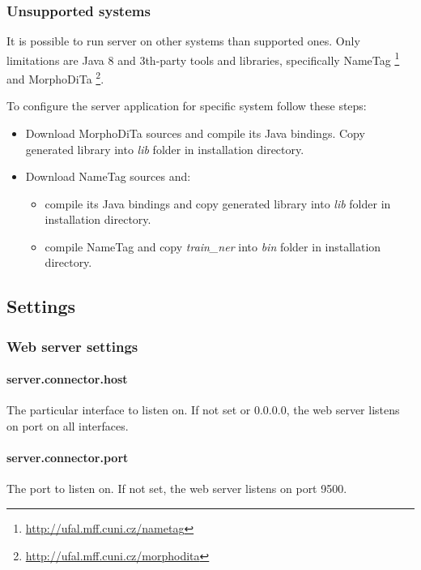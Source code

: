 \subsubsection{Unsupported systems}
\label{sssec:unsupport}
It is possible to run \textan{} server on other systems than supported ones. Only
limitations are Java 8 and 3th-party tools and libraries, specifically NameTag%
\footnote{\url{http://ufal.mff.cuni.cz/nametag}} and MorphoDiTa%
\footnote{\url{http://ufal.mff.cuni.cz/morphodita}}.

To configure the server application for specific system follow these steps:
\begin{itemize}
\item Download MorphoDiTa sources and compile its Java bindings. Copy generated
library into \emph{lib} folder in installation directory.
\item Download NameTag sources and:
	\begin{itemize}
	\item compile its Java bindings and copy generated library into \emph{lib}
	folder in installation directory.
	\item compile NameTag and copy \emph{train\_ner} into \emph{bin} folder in
	installation directory.
	\end{itemize}
\end{itemize}

\subsection{Settings}
\label{sec:ServerSettings}

\subsubsection{Web server settings}
\label{sssec:WebServerSettings}

\paragraph{server.connector.host}
The particular interface to listen on. If not set or 0.0.0.0, the web server
listens on port on all interfaces.

\paragraph{server.connector.port}
The port to listen on. If not set, the web server listens on port 9500.

